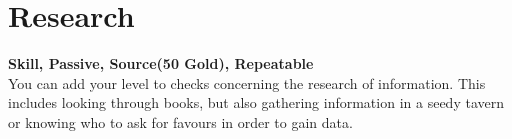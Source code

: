 \section{Research}\label{sec:research}
\textbf{Skill, Passive, Source(50 Gold), Repeatable}\\
You can add your level to checks concerning the research of information. This includes looking through books, but also gathering information in a seedy tavern or knowing who to ask for favours in order to gain data.